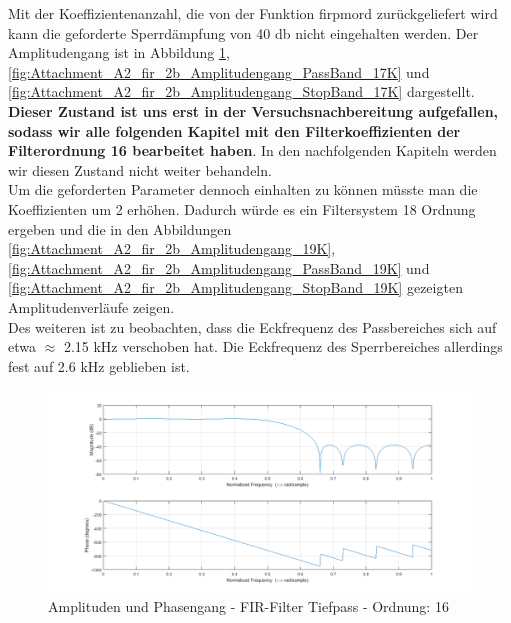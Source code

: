



\noindent Mit der Koeffizientenanzahl, die von der Funktion firpmord zurückgeliefert wird kann die geforderte Sperrdämpfung von 40 db nicht eingehalten werden. Der Amplitudengang ist in Abbildung \ref{fig:Attachment_A2_fir_2b_Amplitudengang_17K}, \ref{fig:Attachment_A2_fir_2b_Amplitudengang_PassBand_17K} und \ref{fig:Attachment_A2_fir_2b_Amplitudengang_StopBand_17K} dargestellt. \textbf{Dieser Zustand ist uns erst in der Versuchsnachbereitung aufgefallen, sodass wir alle folgenden Kapitel mit den Filterkoeffizienten der Filterordnung 16 bearbeitet haben}. In den nachfolgenden Kapiteln werden wir diesen Zustand nicht weiter behandeln.\\
Um die geforderten Parameter dennoch einhalten zu können müsste man die Koeffizienten um 2 erhöhen. Dadurch würde es ein Filtersystem 18 Ordnung ergeben und die in den Abbildungen \ref{fig:Attachment_A2_fir_2b_Amplitudengang_19K}, \ref{fig:Attachment_A2_fir_2b_Amplitudengang_PassBand_19K} und \ref{fig:Attachment_A2_fir_2b_Amplitudengang_StopBand_19K} gezeigten Amplitudenverläufe zeigen.\\
Des weiteren ist zu beobachten, dass die Eckfrequenz des Passbereiches sich auf etwa $\approx$ 2.15 kHz verschoben hat. Die Eckfrequenz des Sperrbereiches allerdings fest auf 2.6 kHz geblieben ist.

\begin{figure}[H]
\centering
\includegraphics[width=1.0\linewidth]{./Bilder/Attachment_A2_fir_2b_Amplitudengang_17K}
\caption{Amplituden und Phasengang - FIR-Filter Tiefpass - Ordnung: 16}
\label{fig:Attachment_A2_fir_2b_Amplitudengang_17K}
\end{figure}


